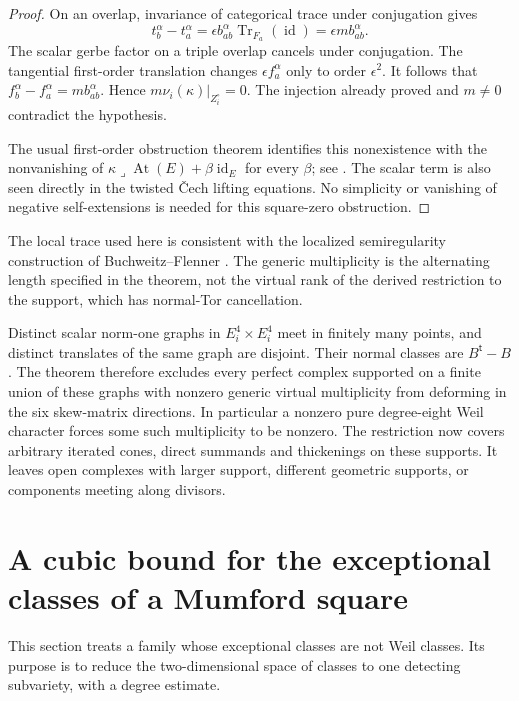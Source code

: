 \documentclass[11pt]{article}
\theoremstyle{definition}
\theoremstyle{remark}
\begin{document}
\begin{proof}
On an overlap, invariance of categorical trace under conjugation gives
\[
 t_b^\alpha-t_a^\alpha
   =\epsilon b_{ab}^\alpha\operatorname{Tr}_{F_a}(\operatorname{id})
   =\epsilon m b_{ab}^\alpha.
\]
The scalar gerbe factor on a triple overlap cancels under conjugation.
The tangential first-order translation changes $\epsilon f_a^\alpha$
only to order $\epsilon^2$. It follows that
$f_b^\alpha-f_a^\alpha=m b_{ab}^\alpha$. Hence
$m\nu_i(\kappa)|_{Z_i^\circ}=0$. The injection already proved and $m\ne0$
contradict the hypothesis.

The usual first-order obstruction theorem identifies this
nonexistence with the nonvanishing of
$\kappa\mathbin{\lrcorner}\operatorname{At}(E)+\beta\operatorname{id}_E$
for every $\beta$; see \cite[Corollary~3.4]{HT}. The scalar term is also
seen directly in the twisted \v Cech lifting equations. No simplicity
or vanishing of negative self-extensions is needed for this square-zero
obstruction.
\end{proof}

The local trace used here is consistent with the localized
semiregularity construction of Buchweitz--Flenner
\cite[Remark~4.7(2), p.~170; Proposition~8.2 and formula~(3),
pp.~200--201]{BF}. The generic multiplicity is the alternating length
specified in the theorem, not the virtual rank of the derived
restriction to the support, which has normal-Tor cancellation.

Distinct scalar norm-one graphs in $E_i^4\times E_i^4$ meet in finitely many points, and distinct translates of the same graph are disjoint. Their normal classes are $B^{\mathsf t}-B$. The theorem therefore excludes every perfect complex supported on a finite union of these graphs with nonzero generic virtual multiplicity from deforming in the six skew-matrix directions. In particular a nonzero pure degree-eight Weil character forces some such multiplicity to be nonzero. The restriction now covers arbitrary iterated cones, direct summands and thickenings on these supports. It leaves open complexes with larger support, different geometric supports, or components meeting along divisors.
\section{A cubic bound for the exceptional classes of a Mumford square}
\label{sec:mumford}
This section treats a family whose exceptional classes are not Weil
classes. Its purpose is to reduce the two-dimensional space of classes
to one detecting subvariety, with a degree estimate.
\end{document}

